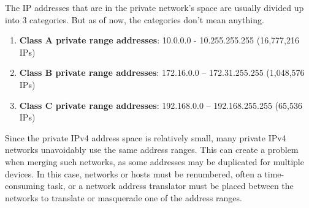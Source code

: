 \documentclass{article}
\begin{document}
  \begin{definition}
  The IP addresses that are in the private network's space are usually divided up into 3 categories. But as of now, the categories don't mean anything. 
  \begin{enumerate}
      \item \textbf{Class A private range addresses}: 10.0.0.0 - 10.255.255.255 (16,777,216 IPs)
      \item \textbf{Class B private range addresses}: 172.16.0.0 – 172.31.255.255 (1,048,576 IPs)
      \item \textbf{Class C private range addresses}: 192.168.0.0 – 192.168.255.255 (65,536 IPs)
  \end{enumerate}
  Since the private IPv4 address space is relatively small, many private IPv4 networks unavoidably use the same address ranges. This can create a problem when merging such networks, as some addresses may be duplicated for multiple devices. In this case, networks or hosts must be renumbered, often a time-consuming task, or a network address translator must be placed between the networks to translate or masquerade one of the address ranges. 
  \end{definition}
\end{document}
